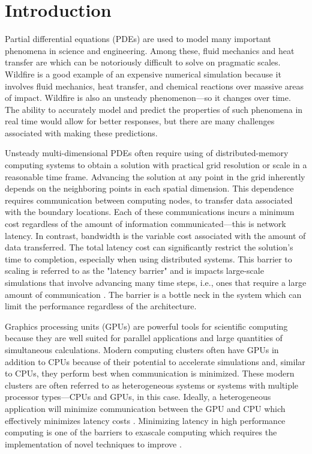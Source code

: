 \documentclass[preprints,article,accept,moreauthors,pdftex]{Definitions/mdpi}
\begin{document}
\section{Introduction}
Partial differential equations (PDEs) are used to model many important phenomena in science and engineering. Among these, fluid mechanics and heat transfer are which can be notoriously difficult to solve on pragmatic scales. Wildfire is a good example of an expensive numerical simulation because it involves fluid mechanics, heat transfer, and chemical reactions over massive areas of impact. Wildfire is also an unsteady phenomenon---so it changes over time. The ability to accurately model and predict the properties of such phenomena in real time would allow for better responses, but there are many challenges associated with making these predictions.

Unsteady multi-dimensional PDEs often require using of distributed-memory computing systems to obtain a solution with practical grid resolution or scale in a reasonable time frame. Advancing the solution at any point in the grid inherently depends on the neighboring points in each spatial dimension. This dependence requires communication between computing nodes, to transfer data associated with the boundary locations. Each of these communications incurs a minimum cost regardless of the amount of information communicated---this is network latency. In contrast, bandwidth is the variable cost associated with the amount of data transferred. The total latency cost can significantly restrict the solution's time to completion, especially when using distributed systems. This barrier to scaling is referred to as the "latency barrier" and is impacts large-scale simulations that involve advancing many time steps, i.e., ones that require a large amount of communication \cite{Alhubail2016ThePDEs}. The barrier is a bottle neck in the system which can limit the performance regardless of the architecture.

\par
Graphics processing units (GPUs) are powerful tools for scientific computing because they are well suited for parallel applications and large quantities of simultaneous calculations. Modern computing clusters often have GPUs in addition to CPUs because of their potential to accelerate simulations and, similar to CPUs, they perform best when communication is minimized. These modern clusters are often referred to as heterogeneous systems or systems with multiple processor types---CPUs and GPUs, in this case. Ideally, a heterogeneous application will minimize communication between the GPU and CPU which effectively minimizes latency costs \cite{OanceaGPGPUCOMPUTING}. Minimizing latency in high performance computing is one of the barriers to exascale computing which requires the implementation of novel techniques to improve \cite{Alexandrov2016RouteSkills}.
\end{document}
